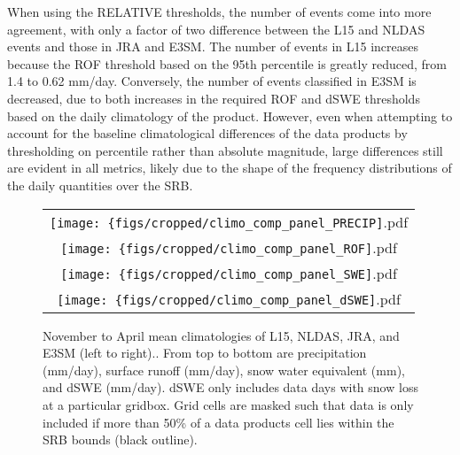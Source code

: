 \documentclass[draft]{agujournal2019}
\begin{document}
When using the RELATIVE thresholds, the number of events come into more agreement, with only a factor of two difference between the L15 and NLDAS events and those in JRA and E3SM. The number of events in L15 increases because the ROF threshold based on the 95th percentile is greatly reduced, from 1.4 to 0.62 mm/day. Conversely, the number of events classified in E3SM is decreased, due to both increases in the required ROF and dSWE thresholds based on the daily climatology of the product. However, even when attempting to account for the baseline climatological differences of the data products by thresholding on percentile rather than absolute magnitude, large differences still are evident in all metrics, likely due to the shape of the frequency distributions of the daily quantities over the SRB.


\begin{figure}
\begin{tabular}{c}
\texttt{[image: \{figs/cropped/climo\_comp\_panel\_PRECIP]}.pdf} \\
\texttt{[image: \{figs/cropped/climo\_comp\_panel\_ROF]}.pdf} \\
\texttt{[image: \{figs/cropped/climo\_comp\_panel\_SWE]}.pdf} \\
\texttt{[image: \{figs/cropped/climo\_comp\_panel\_dSWE]}.pdf}
\end{tabular}
\caption{November to April mean climatologies of L15, NLDAS, JRA, and E3SM (left to right).. From top to bottom are precipitation (mm/day), surface runoff (mm/day), snow water equivalent (mm), and dSWE (mm/day). dSWE only includes data days with snow loss at a particular gridbox. Grid cells are masked such that data is only included if more than 50\% of a data products cell lies within the SRB bounds (black outline).}
\label{fig:means}
\end{figure}
\end{document}
